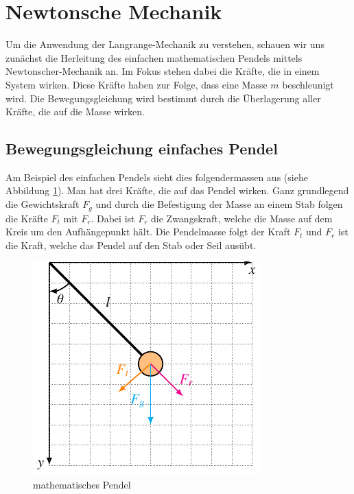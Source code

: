 \section{Newtonsche Mechanik}
%
Um die Anwendung der Langrange-Mechanik zu verstehen, schauen wir uns zunächst
die Herleitung des einfachen mathematischen Pendels mittels Newtonscher-Mechanik an.
Im Fokus stehen dabei die Kräfte, die in einem System wirken.
Diese Kräfte haben zur Folge, dass eine Masse \(m\) beschleunigt wird.
Die Bewegungsgleichung wird bestimmt durch die Überlagerung aller Kräfte, die auf
die Masse wirken.

\subsection{Bewegungsgleichung einfaches Pendel}
Am Beispiel des einfachen Pendels sieht dies folgendermassen aus
(siehe Abbildung \ref{fig:pendulum1}).
Man hat drei Kräfte, die auf das Pendel wirken.
Ganz grundlegend die Gewichtskraft \(F_g\) und durch die Befestigung der Masse
an einem Stab folgen die Kräfte \(F_t\) mit \(F_r\).
Dabei ist \(F_r\) die Zwangskraft, welche die Masse auf dem Kreis um
den Aufhängepunkt hält.
Die Pendelmasse folgt der Kraft \(F_t\) und \(F_r\) ist die Kraft, welche
das Pendel auf den Stab oder Seil ausübt.

\begin{figure}
    \centering
    \includegraphics{papers/doppelpendel/images/pendel_pic1.pdf}
    \caption{mathematisches Pendel}
    \label{fig:pendulum1}
\end{figure}


